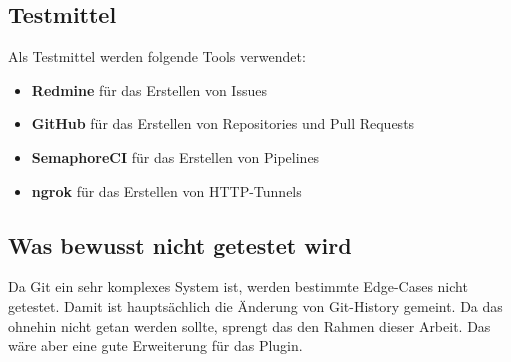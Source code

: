 \subsection{Testmittel}
Als Testmittel werden folgende Tools verwendet:
\begin{itemize}
  \item \textbf{Redmine} für das Erstellen von Issues
  \item \textbf{GitHub} für das Erstellen von Repositories und Pull Requests
  \item \textbf{SemaphoreCI} für das Erstellen von Pipelines
  \item \textbf{ngrok} für das Erstellen von HTTP-Tunnels
\end{itemize}

\subsection{Was bewusst nicht getestet wird}
Da Git ein sehr komplexes System ist, werden bestimmte Edge-Cases nicht getestet. Damit ist hauptsächlich
die Änderung von Git-History gemeint. Da das ohnehin nicht getan werden sollte, sprengt das den Rahmen
dieser Arbeit. Das wäre aber eine gute Erweiterung für das Plugin.
